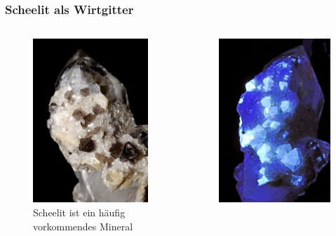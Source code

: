 \documentclass{beamer}
\begin{document}
\begin{frame}[t]\frametitle{Scheelit  als Wirtgitter}
     \begin{columns}
              \begin{figure}[!h]
\centering
      \includegraphics{pics/scheelitesurquarz.jpg}
      \caption*{\footnotesize Scheelit ist ein häufig vorkommendes Mineral}
 \end{figure}
  
 \begin{figure}[!h]
\centering
      \includegraphics{pics/scheelitesurquarz2.jpg}
     

\end{figure}
\end{columns}
\end{frame}
\end{document}
